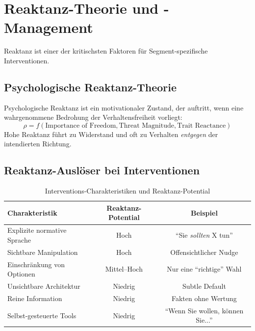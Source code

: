 \section{Reaktanz-Theorie und -Management}
\label{sec:19-reactance}

Reaktanz ist einer der kritischsten Faktoren für Segment-spezifische Interventionen.

\subsection{Psychologische Reaktanz-Theorie}

\begin{definition}
\label{def:19-reactance}
Psychologische Reaktanz ist ein motivationaler Zustand, der auftritt, wenn eine wahrgenommene Bedrohung der Verhaltensfreiheit vorliegt:
\begin{equation}
\rho = f(\text{Importance of Freedom}, \text{Threat Magnitude}, \text{Trait Reactance})
\label{eq:19-reactance-def}
\end{equation}
Hohe Reaktanz führt zu Widerstand und oft zu Verhalten \textit{entgegen} der intendierten Richtung.
\end{definition}

\subsection{Reaktanz-Auslöser bei Interventionen}

\begin{table}[htbp]
\centering
\caption{Interventions-Charakteristiken und Reaktanz-Potential}
\label{tab:19-reactance-triggers}
\renewcommand{\arraystretch}{1.3}
\small
\begin{tabular}{@{}lcc@{}}
\toprule
\textbf{Charakteristik} & \textbf{Reaktanz-Potential} & \textbf{Beispiel} \\
\midrule
Explizite normative Sprache & Hoch & ``Sie \textit{sollten} X tun'' \\
Sichtbare Manipulation & Hoch & Offensichtlicher Nudge \\
Einschränkung von Optionen & Mittel--Hoch & Nur eine ``richtige'' Wahl \\
Unsichtbare Architektur & Niedrig & Subtle Default \\
Reine Information & Niedrig & Fakten ohne Wertung \\
Selbst-gesteuerte Tools & Niedrig & ``Wenn Sie wollen, können Sie...'' \\
\bottomrule
\end{tabular}
\end{table}

